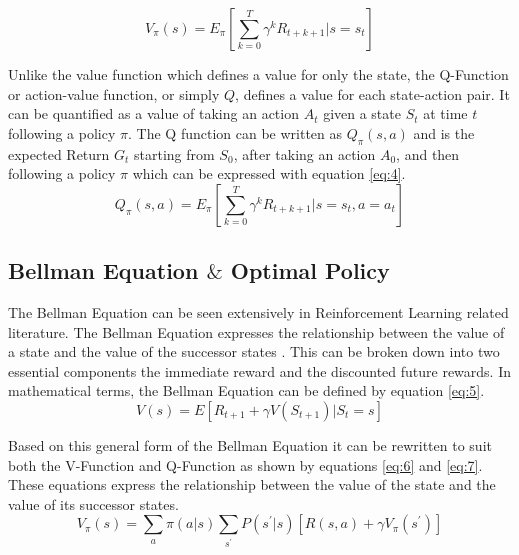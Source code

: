 \begin{equation}\label{eq:3}
    V_{\pi} (s) = E_{\pi} [\sum_{k=0}^{T} \gamma^{k} R_{t+k+1} | s=s_t]
\end{equation}

Unlike the value function which defines a value for only the state, the Q-Function or action-value function, or simply $Q$, defines a value for each state-action pair. It can be quantified as a value of taking an action $A_t$ given a state $S_t$ at time $t$ following a policy $\pi$. The Q function can be written as $Q_{\pi} (s, a)$ and is the expected Return $G_t$ starting from $S_0$, after taking an action $A_0$, and then following a policy $\pi$ which can be expressed with equation \ref{eq:4}. \\

\begin{equation}\label{eq:4}
    Q_{\pi} (s, a) = E_{\pi} [\sum_{k=0}^{T} \gamma^{k} R_{t+k+1} | s=s_t, a=a_t]
\end{equation}

\subsection{Bellman Equation $\&$ Optimal Policy}

The Bellman Equation \cite{DPBE} \cite{BE} can be seen extensively in Reinforcement Learning related literature. The Bellman Equation expresses the relationship between the value of a state and the value of the successor states \cite{Sutton1998}. This can be broken down into two essential components the immediate reward and the discounted future rewards. In mathematical terms, the Bellman Equation can be defined by equation \ref{eq:5}. \\

\begin{equation}\label{eq:5}
    V(s) = E [R_{t+1} + \gamma V(S_{t+1}) | S_t = s]
\end{equation}

Based on this general form of the Bellman Equation it can be rewritten to suit both the V-Function and Q-Function as shown by equations \ref{eq:6} and \ref{eq:7}. These equations express the relationship between the value of the state and the value of its successor states. \\

\begin{equation}\label{eq:6}
    V_{\pi}(s) = \sum_{a} \pi (a|s)\sum_{s^{'}} P(s^{'}|s) [R(s, a) + \gamma V_{\pi} (s^{'})]
\end{equation}


